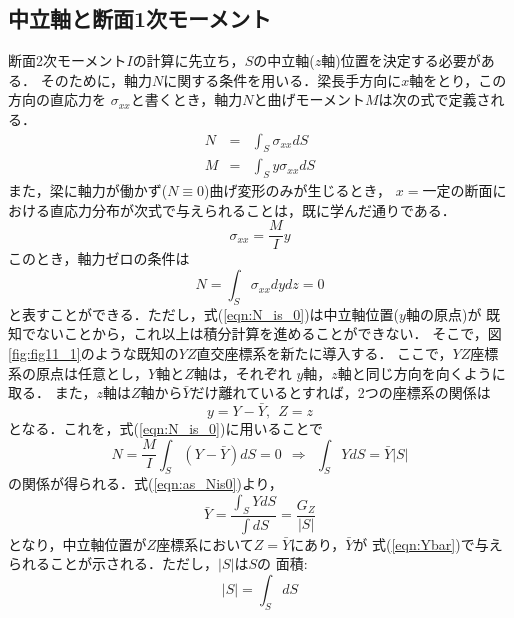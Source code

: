 \documentclass[10pt,a4j]{jarticle}
\begin{document}
\subsection{中立軸と断面1次モーメント}
断面2次モーメント$I$の計算に先立ち，$S$の中立軸($z$軸)位置を決定する必要がある．
そのために，軸力$N$に関する条件を用いる．梁長手方向に$x$軸をとり，この方向の直応力を
$\sigma_{xx}$と書くとき，軸力$N$と曲げモーメント$M$は次の式で定義される．
\begin{eqnarray}
	N &= & \int_S \sigma_{xx}dS 
	\label{eqn:def_N}
	\\
	M &= & \int_S y\sigma_{xx}dS 
	\label{eqn:def_M}
\end{eqnarray}
また，梁に軸力が働かず($N\equiv 0$)曲げ変形のみが生じるとき，
$x=$一定の断面における直応力分布が次式で与えられることは，既に学んだ通りである．
\begin{equation}
	\sigma_{xx}=\frac{M}{I}y
	\label{eqn:sig_xx}
\end{equation}
このとき，軸力ゼロの条件は
\begin{equation}
	N =  \int_S \sigma_{xx}dydz = 0 
	\label{eqn:N_is_0}
\end{equation}
と表すことができる．ただし，式(\ref{eqn:N_is_0})は中立軸位置($y$軸の原点)が
既知でないことから，これ以上は積分計算を進めることができない．
そこで，図\ref{fig:fig11_1}のような既知の$YZ$直交座標系を新たに導入する．
ここで，$YZ$座標系の原点は任意とし，$Y$軸と$Z$軸は，それぞれ
$y$軸，$z$軸と同じ方向を向くように取る．
また，$z$軸は$Z$軸から$\bar{Y}$だけ離れているとすれば，2つの座標系の関係は
\begin{equation}
	y=Y-\bar Y, \ \ Z=z
	\label{eqn:y_shift}
\end{equation}
となる．これを，式(\ref{eqn:N_is_0})に用いることで
\begin{equation}
	N=\frac{M}{I}\int_S \left(Y-\bar Y \right)dS=0 
	\ \ \Rightarrow \ \
	\int_S Y dS =\bar Y \left| S \right|
	\label{eqn:as_Nis0}
\end{equation}
の関係が得られる．式(\ref{eqn:as_Nis0})より，
\begin{equation}
	\bar Y
	= \frac{\int_S YdS }{\int dS}
	= \frac{G_Z}{\left| S \right|}
	\label{eqn:Ybar}
\end{equation}
となり，中立軸位置が$Z$座標系において$Z=\bar{Y}$にあり，$\bar{Y}$が
式(\ref{eqn:Ybar})で与えられることが示される．ただし，$\left| S\right|$は$S$の
面積:
\begin{equation}
	\left| S \right| = \int_S dS
	\label{eqn:area}
\end{equation}
\end{document}
